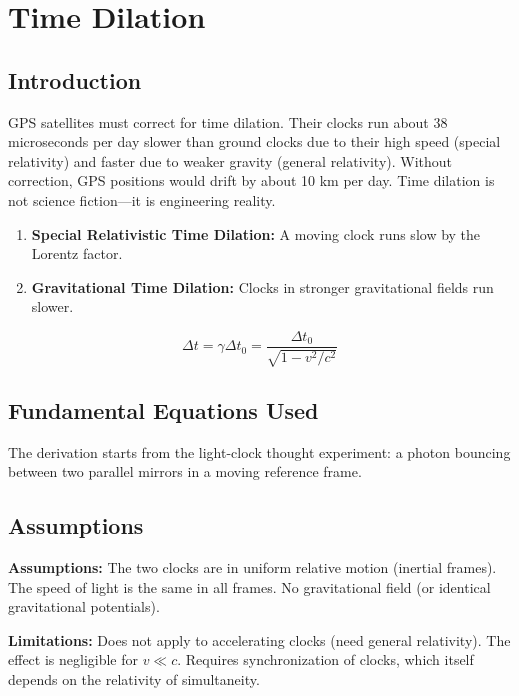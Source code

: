 \chapter{Time Dilation}

\section*{Introduction}

GPS satellites must correct for time dilation. Their clocks run about 38 microseconds per day slower than ground clocks due to their high speed (special relativity) and faster due to weaker gravity (general relativity). Without correction, GPS positions would drift by about 10 km per day. Time dilation is not science fiction---it is engineering reality.

\begin{enumerate}
\item \textbf{Special Relativistic Time Dilation:} A moving clock runs slow by the Lorentz factor.

\item \textbf{Gravitational Time Dilation:} Clocks in stronger gravitational fields run slower.

\end{enumerate}


\[
\Delta t = \gamma \Delta t_0 = \frac{\Delta t_0}{\sqrt{1 - v^2/c^2}}
\]

\section*{Fundamental Equations Used}

The derivation starts from the light-clock thought experiment: a photon bouncing between two parallel mirrors in a moving reference frame.

\section*{Assumptions}

\textbf{Assumptions:} The two clocks are in uniform relative motion (inertial frames). The speed of light is the same in all frames. No gravitational field (or identical gravitational potentials).


\textbf{Limitations:} Does not apply to accelerating clocks (need general relativity). The effect is negligible for $v \ll c$. Requires synchronization of clocks, which itself depends on the relativity of simultaneity.


